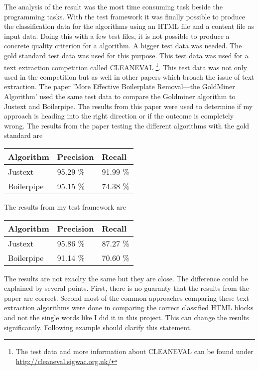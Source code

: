 The analysis of the result was the most time consuming task beside the programming tasks. With the test framework it was finally possible to produce the classification data for the  algorithms using an HTML file and a content file as input data. Doing this with a few test files, it is not possible to produce a concrete quality criterion for a algorithm. A bigger test data was needed. The gold standard test data was used for this purpose. This test data was used for a text extraction competition called CLEANEVAL \footnote{The test data and more information about CLEANEVAL can be found under \url{http://cleaneval.sigwac.org.uk/}}. This test data was not only used in the competition but as well in other papers which broach the issue of text extraction. The paper 'More Effective Boilerplate Removal—the GoldMiner Algorithm' used the same test data to compare the Goldminer algorithm to Justext and Boilerpipe. The results from this paper were used to determine if my approach is heading into the right direction or if the outcome is completely wrong. 
The results from the paper testing the different algorithms with the gold standard  are

\begin{tabular}{| p{3cm} | p{3cm} | p{3cm} | }
    \hline
    \textbf{Algorithm}      & \textbf{Precision}  & \textbf{Recall} 				\\ \hline
    Justext     & 95.29 \%       &  91.99 \%		\\ \hline
    Boilerpipe & 95.15 \%       &  74.38 \%		\\ \hline
\end{tabular}

The results from my test framework are

\begin{tabular}{| p{3cm} | p{3cm} | p{3cm} | }
    \hline
    \textbf{Algorithm}      & \textbf{Precision}  & \textbf{Recall} 				\\ \hline
    Justext     & 95.86 \%       &  87.27 \%		\\ \hline
    Boilerpipe & 91.14 \%       &  70.60 \%		\\ \hline
\end{tabular}

The results are not exaclty the same but they are close. The difference could be explained by several points. First, there is no guaranty that the results from the paper are correct. Second most of the common approaches comparing these text extraction algorithms were done in comparing the correct classified HTML blocks and not the single words like I did it in this project. This can change the results significantly. Following example should clarify this statement.


